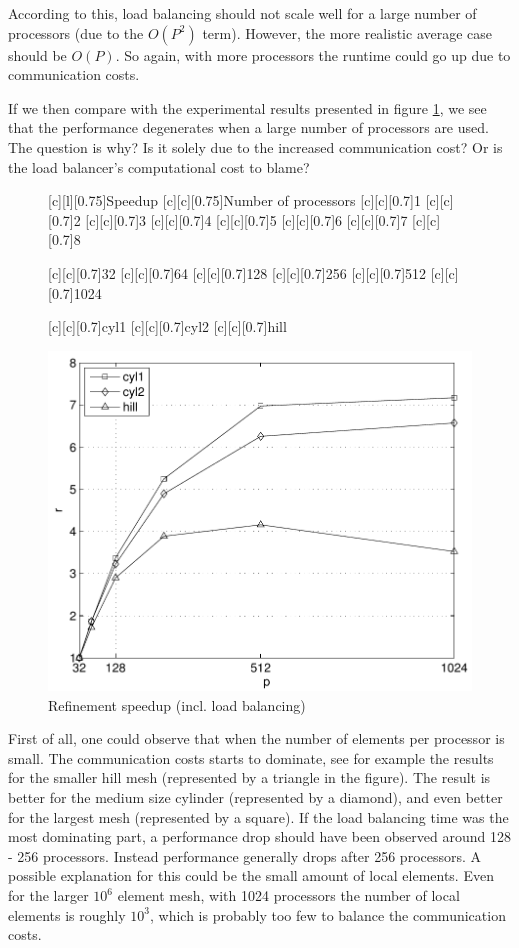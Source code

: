 According to this, load balancing should not scale well for a large
number of processors (due to the $O(P^2)$ term). However, the more
realistic average case should be $O(P)$. So again, with more
processors the runtime could go up due to communication costs.

If we then compare with the experimental results presented in figure
\ref{hoffman-4:fig:refsp}, we see that the performance degenerates when a large
number of processors are used. The question is why? Is it solely due
to the increased communication cost? Or is the load balancer's
computational cost to blame?
\begin{figure}[hbt]
  [c][l][0.75]{Speedup}
  [c][c][0.75]{Number of processors}
  [c][c][0.7]{1}
  [c][c][0.7]{2}
  [c][c][0.7]{3}
  [c][c][0.7]{4}
  [c][c][0.7]{5}
  [c][c][0.7]{6}
  [c][c][0.7]{7}
  [c][c][0.7]{8}

  [c][c][0.7]{32}
  [c][c][0.7]{64}
  [c][c][0.7]{128}
  [c][c][0.7]{256}
  [c][c][0.7]{512}
  [c][c][0.7]{1024}

  [c][c][0.7]{cyl1}
  [c][c][0.7]{cyl2}
  [c][c][0.7]{hill}

  \begin{center}
      \includegraphics[width=0.55\columnwidth]{chapters/hoffman-4/pdf/speedup.pdf}
      \caption{Refinement speedup (incl. load balancing)}
      \label{hoffman-4:fig:refsp}
  \end{center}
\end{figure}

First of all, one could observe that when the number of elements per
processor is small. The communication costs starts to dominate, see
for example the results for the smaller hill mesh (represented by a
triangle in the figure). The result is better for the medium size
cylinder (represented by a diamond), and even better for the largest
mesh (represented by a square). If the load balancing time was the
most dominating part, a performance drop should have been observed
around 128 - 256 processors. Instead performance generally drops after
256 processors. A possible explanation for this could be the small
amount of local elements. Even for the larger $10^6$ element mesh,
with 1024 processors the number of local elements is roughly $10^3$,
which is probably too few to balance the communication costs.


